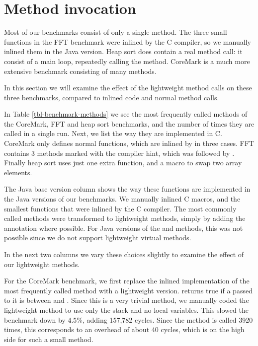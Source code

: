 \section{Method invocation}
\label{sec-evaluation-method-invocation}


Most of our benchmarks consist of only a single method. The three small functions in the FFT benchmark were inlined by the C compiler, so we manually inlined them in the Java version. Heap sort does contain a real method call: it consist of a main loop, repeatedly calling the  method. CoreMark is a much more extensive benchmark consisting of many methods.

In this section we will examine the effect of the lightweight method calls on these three benchmarks, compared to inlined code and normal method calls.

In Table \ref{tbl-benchmark-methods} we see the most frequently called methods of the CoreMark, FFT and heap sort benchmarks, and the number of times they are called in a single run. Next, we list the way they are implemented in C. CoreMark only defines normal functions, which are inlined by  in three cases. FFT contains 3 methods marked with the  compiler hint, which was followed by . Finally heap sort uses just one extra function, and a macro to swap two array elements.

The Java base version column shows the way these functions are implemented in the Java versions of our benchmarks. We manually inlined C macros, and the smallest functions that were inlined by the C compiler. The most commonly called methods were transformed to lightweight methods, simply by adding the  annotation where possible. For Java versions of the  and  methods, this was not possible since we do not support lightweight virtual methods.

In the next two columns we vary these choices slightly to examine the effect of our lightweight methods.

For the CoreMark benchmark, we first replace the inlined implementation of the most frequently called method with a lightweight version.  returns true if a  passed to it is between  and . Since this is a very trivial method, we manually coded the lightweight method to use only the stack and no local variables. This slowed the benchmark down by 4.5\%, adding 157,782 cycles. Since the method is called 3920 times, this corresponds to an overhead of about 40 cycles, which is on the high side for such a small method.

